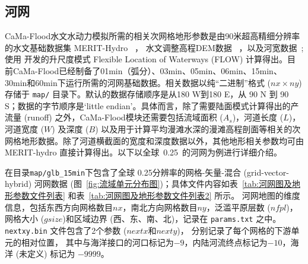 \subsection{河网}
CaMa-Flood水文水动力模拟所需的相关次网格地形参数是由90米超高精细分辨率的水文基础数据集 MERIT-Hydro ~\citep{yamazaki2019merit}，
水文调整高程DEM数据 ~\citep{yamazaki2017high,yamazaki2012analysis}，以及河宽数据~\citep{yamazaki2014development}; 
使用 \citet{yamazaki2009deriving} 开发的升尺度模式 Flexible Location of Waterways (FLOW) 计算得出。目前CaMa-Flood已经制备了01min（弧分）、03min、05min、06min、15min、30min和60min下运行所需的河网基础数据。相关数据以纯``二进制''格式 ($nx\times ny$)存储于 \texttt{map/} 目录下。默认的数据存储顺序是从180 \textdegree W到180 \textdegree E，从 90 \textdegree N 到 90 \textdegree S；数据的字节顺序是`little endian'。具体而言，除了需要陆面模式计算得出的产流量 (runoff) 之外，CaMa-Flood模块还需要包括流域面积 ($A_s$)，河道长度 ($L$)，河道宽度 ($W$) 及深度 ($B$) 以及用于计算平均漫滩水深的漫滩高程剖面等相关的次网格地形数据。除了河道横截面的宽度和深度数据以外，其他地形相关参数均可由 MERIT-hydro 直接计算得出。以下以全球~0.25\textdegree ~的河网为例进行详细介绍。


在目录\texttt{map/glb\_15min}下包含了全球 0.25\textdegree 分辨率的网格-矢量-混合 (grid-vector-hybrid) 河网数据 (图~\ref{fig:流域单元分布图})；具体文件内容如表~\ref{tab:河网图及地形参数文件列表} 和表~\ref{tab:河网图及地形参数文件列表2} 所示。 河网地图的维度信息，包括东西方向网格数目$nx$，南北方向网格数目$ny$，泛滥平原层数 ($nfpl$)，
网格大小 ($gsize$)和区域边界 (西、东、南、北)，记录在 \texttt{params.txt} 之中。\texttt{nextxy.bin} 文件包含了2个参数 ($nextx$和$nexty$)，
分别记录了每个网格的下游单元的相对位置，
其中与海洋接口的河口标记为$-9$，内陆河流终点标记为$-10$，海洋 (未定义) 标记为 $-9999$。

